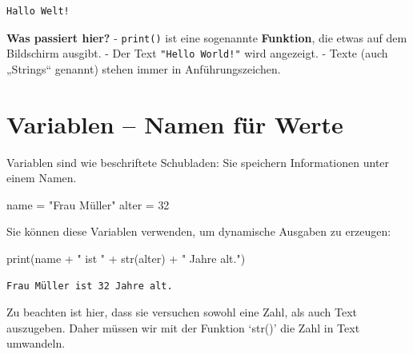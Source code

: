 \documentclass[
  letterpaper,
  DIV=11,
  numbers=noendperiod]{scrreprt}
\newenvironment{Shaded}{\begin{snugshade}}{\end{snugshade}}
\newcommand{\BuiltInTok}[1]{\textcolor[rgb]{0.00,0.23,0.31}{#1}}
\newcommand{\DecValTok}[1]{\textcolor[rgb]{0.68,0.00,0.00}{#1}}
\newcommand{\NormalTok}[1]{\textcolor[rgb]{0.00,0.23,0.31}{#1}}
\newcommand{\OperatorTok}[1]{\textcolor[rgb]{0.37,0.37,0.37}{#1}}
\newcommand{\StringTok}[1]{\textcolor[rgb]{0.13,0.47,0.30}{#1}}
\begin{document}
\begin{verbatim}
Hallo Welt!
\end{verbatim}

\textbf{Was passiert hier?} - \texttt{print()} ist eine sogenannte
\textbf{Funktion}, die etwas auf dem Bildschirm ausgibt. - Der Text
\texttt{"Hello\ World!"} wird angezeigt. - Texte (auch „Strings``
genannt) stehen immer in Anführungszeichen.

\section{Variablen -- Namen für
Werte}\label{variablen-namen-fuxfcr-werte}

Variablen sind wie beschriftete Schubladen: Sie speichern Informationen
unter einem Namen.

\begin{Shaded}
\begin{Highlighting}[]
\NormalTok{name }\OperatorTok{=} \StringTok{"Frau Müller"}
\NormalTok{alter }\OperatorTok{=} \DecValTok{32}
\end{Highlighting}
\end{Shaded}

Sie können diese Variablen verwenden, um dynamische Ausgaben zu
erzeugen:

\begin{Shaded}
\begin{Highlighting}[]
\BuiltInTok{print}\NormalTok{(name }\OperatorTok{+} \StringTok{" ist "} \OperatorTok{+} \BuiltInTok{str}\NormalTok{(alter) }\OperatorTok{+} \StringTok{" Jahre alt."}\NormalTok{)}
\end{Highlighting}
\end{Shaded}

\begin{verbatim}
Frau Müller ist 32 Jahre alt.
\end{verbatim}

Zu beachten ist hier, dass sie versuchen sowohl eine Zahl, als auch Text
auszugeben. Daher müssen wir mit der Funktion `str()' die Zahl in Text
umwandeln.
\end{document}

